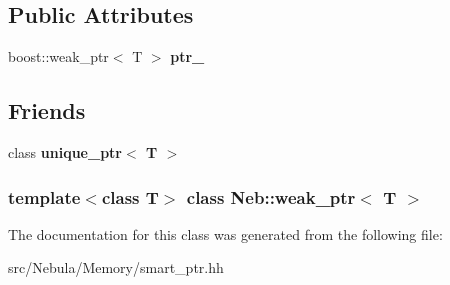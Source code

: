\subsection*{\-Public \-Attributes}
\begin{DoxyCompactItemize}
\item 
\hypertarget{classNeb_1_1weak__ptr_a9ffc8d0fd4564e9e82d6827570768603}{boost\-::weak\-\_\-ptr$<$ \-T $>$ {\bfseries ptr\-\_\-}}\label{classNeb_1_1weak__ptr_a9ffc8d0fd4564e9e82d6827570768603}

\end{DoxyCompactItemize}
\subsection*{\-Friends}
\begin{DoxyCompactItemize}
\item 
\hypertarget{classNeb_1_1weak__ptr_af421c41ed797729bb606ba7df50551aa}{class {\bfseries unique\-\_\-ptr$<$ T $>$}}\label{classNeb_1_1weak__ptr_af421c41ed797729bb606ba7df50551aa}

\end{DoxyCompactItemize}
\subsubsection*{template$<$class \-T$>$ class Neb\-::weak\-\_\-ptr$<$ T $>$}



\-The documentation for this class was generated from the following file\-:\begin{DoxyCompactItemize}
\item 
src/\-Nebula/\-Memory/smart\-\_\-ptr.\-hh\end{DoxyCompactItemize}
